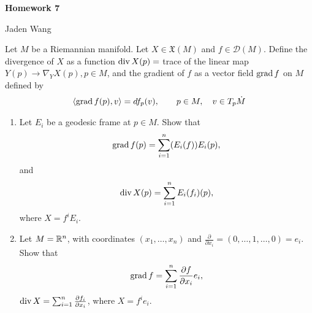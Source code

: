 \documentclass[12pt]{article}
\begin{document}
\centerline {\textsf{\textbf{\LARGE{Homework 7}}}}
\centerline {Jaden Wang}
\vspace{.15in}

\begin{problem}[do Carmo 3.8]
Let $ M$ be a Riemannian manifold. Let  $ X \in \mathfrak{X}(M)$ and $ f \in \mathcal{D}(M)$. Define the divergence of $ X$ as a function  $ \operatorname{div} X(p) =$ trace of the linear map $ Y(p) \to \nabla _Y X(p), p \in M$, and the gradient of $ f$ as a vector field  $ \operatorname{grad} f$  on $ M$ defined by
 \begin{align*}
	\langle \operatorname{grad} f(p), v \rangle = df_p(v), \qquad p \in M, \quad v \in T_p\dot{M}
\end{align*}
\begin{enumerate}[label=(\alph*)]
	\item Let $ E_i$ be a geodesic frame at $ p \in M$. Show that
		\begin{align*}
			\operatorname{grad} f(p) = \sum_{ i= 1}^{ n} (E_i(f)) E_i(p),
		\end{align*}
		and
		\begin{align*}
			\operatorname{div} X(p) = \sum_{ i= 1}^{ n} E_i(f_i)(p),
		\end{align*}
		where $ X = f^{i} E_i$.
	\item Let $ M = \mathbb{R}^{n}$, with coordinates $ (x_1,\ldots,x_n)$ and $ \frac{\partial }{\partial x_i} = (0,\ldots,1,\ldots,0) = e_i$. Show that
		\begin{align*}
			\operatorname{grad} f = \sum_{ i= 1}^{ n} \frac{\partial f}{\partial x_i} e_i, 
		\end{align*}
		$ \operatorname{div} X = \sum_{ i= 1}^{ n} \frac{\partial f_i}{\partial x_i} $, where $ X = f^{i} e_i$.
\end{enumerate}
\end{problem}
\end{document}

